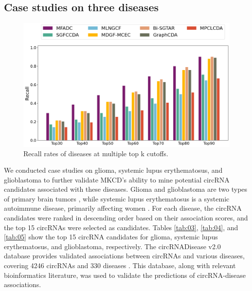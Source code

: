\documentclass[journal=jcisd8,manuscript=article]{achemso}
\begin{document}
\vspace{-0.5cm}

\subsection{Case studies on three diseases}
\vspace{-0.3cm}
\begin{figure}[!t]
    \centering
    \includegraphics[width=5in]{fig/TopK_Recall.png}
     \caption{Recall rates of diseases at multiple top k cutoffs.}
    \label{fig:topK}
\end{figure}

We conducted case studies on glioma, systemic lupus erythematosus, and glioblastoma to further validate MKCD’s ability to mine potential circRNA candidates associated with these diseases. Glioma and glioblastoma are two types of primary brain tumors \cite{weller2015glioma, wirsching2017glioblastoma}, while systemic lupus erythematosus is a systemic autoimmune disease, primarily affecting women \cite{borchers2010geoepidemiology}. For each disease, the circRNA candidates were ranked in descending order based on their association scores, and the top 15 circRNAs were selected as candidates. Tables \ref{tab:03}, \ref{tab:04}, and \ref{tab:05} show the top 15 circRNA candidates for glioma, systemic lupus erythematosus, and glioblastoma, respectively. The circRNADisease v2.0 database provides validated associations between circRNAs and various diseases, covering 4246 circRNAs and 330 diseases \cite{sun2024mode}. This database, along with relevant bioinformatics literature, was used to validate the predictions of circRNA-disease associations.
\end{document}
